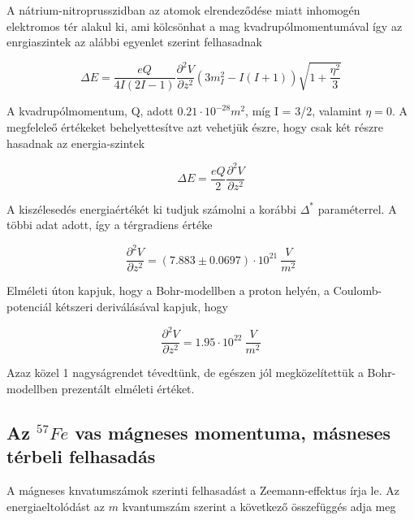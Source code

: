 \documentclass[a4paper,12pt]{article}
\begin{document}
\par A nátrium-nitroprusszidban az atomok elrendeződése miatt inhomogén elektromos tér alakul ki, ami kölcsönhat a mag kvadrupólmomentumával így az enrgiaszintek az alábbi egyenlet szerint felhasadnak

\begin{equation*}
\Delta E = \frac{eQ}{4I(2I - 1)}\frac{\partial^{2}V}{\partial z^{2}}(3m_{I}^{2} - I(I+1))\sqrt{1+\frac{\eta^{2}}{3}}
\end{equation*}

\par A kvadrupólmomentum, Q, adott $0.21\cdot 10^{-28} m^{2}$, míg I = 3/2, valamint $\eta = 0$. A megfeleleő értékeket behelyettesítve azt vehetjük észre, hogy csak két részre hasadnak az energia-szintek

\begin{equation*}
\Delta E = \frac{eQ}{2}\frac{\partial^{2} V}{\partial z^{2}}
\end{equation*}

\par A kiszélesedés energiaértékét ki tudjuk számolni a korábbi $\Delta^{*}$ paraméterrel. A többi adat adott, így a térgradiens értéke

\begin{equation*}
\frac{\partial^{2}V}{\partial z^{2}} = (7.883 \pm 0.0697) \cdot 10^{21} ~\frac{V}{m^{2}}
\end{equation*}

\par Elméleti úton kapjuk, hogy a Bohr-modellben a proton helyén, a Coulomb-potenciál kétszeri deriválásával kapjuk, hogy

\begin{equation*}
\frac{\partial^{2}V}{\partial z^{2}} = 1.95 \cdot 10^{22} ~\frac{V}{m^{2}}
\end{equation*}

\par Azaz közel 1 nagyságrendet tévedtünk, de egészen jól megközelítettük a Bohr-modellben prezentált elméleti értéket.

\subsection{Az $^{57}Fe$ vas mágneses momentuma, másneses térbeli felhasadás}

\par A mágneses knvatumszámok szerinti felhasadást a Zeemann-effektus írja le. Az energiaeltolódást az $m$ kvantumszám szerint a következő összefüggés adja meg
\end{document}
